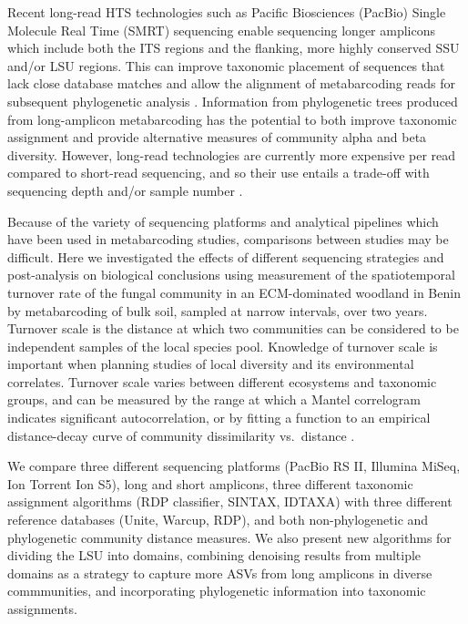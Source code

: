 \documentclass[
  12pt,
]{article}
\begin{document}
Recent long-read HTS technologies such as Pacific Biosciences (PacBio) Single Molecule Real Time (SMRT) sequencing enable sequencing longer amplicons which include both the ITS regions and the flanking, more highly conserved SSU and/or LSU regions.
This can improve taxonomic placement of sequences that lack close database matches and allow the alignment of metabarcoding reads for subsequent phylogenetic analysis \autocite{Tedersoo2018}.
Information from phylogenetic trees produced from long-amplicon metabarcoding has the potential to both improve taxonomic assignment and provide alternative measures of community alpha and beta diversity.
However, long-read technologies are currently more expensive per read compared to short-read sequencing, and so their use entails a trade-off with sequencing depth and/or sample number \autocite{Kennedy2018}.

Because of the variety of sequencing platforms and analytical pipelines which have been used in metabarcoding studies, comparisons between studies may be difficult.
Here we investigated the effects of different sequencing strategies and post-analysis on biological conclusions using measurement of the spatiotemporal turnover rate of the fungal community in an ECM-dominated woodland in Benin by metabarcoding of bulk soil, sampled at narrow intervals, over two years.
Turnover scale is the distance at which two communities can be considered to be independent samples of the local species pool.
Knowledge of turnover scale is important when planning studies of local diversity and its environmental correlates.
Turnover scale varies between different ecosystems and taxonomic groups,
and can be measured by the range at which a Mantel correlogram indicates significant autocorrelation,
or by fitting a function to an empirical distance-decay curve of community dissimilarity vs.~distance \autocite{legendre2012}.

We compare three different sequencing platforms (PacBio RS II, Illumina MiSeq, Ion Torrent Ion S5), long and short amplicons, three different taxonomic assignment algorithms (RDP classifier, SINTAX, IDTAXA)
with three different reference databases (Unite, Warcup, RDP),
and both non-phylogenetic and phylogenetic community distance measures.
We also present new algorithms for dividing the LSU into domains, combining denoising results from multiple domains as a strategy to capture more ASVs from long amplicons in diverse commmunities, and incorporating phylogenetic information into taxonomic assignments.
\end{document}
